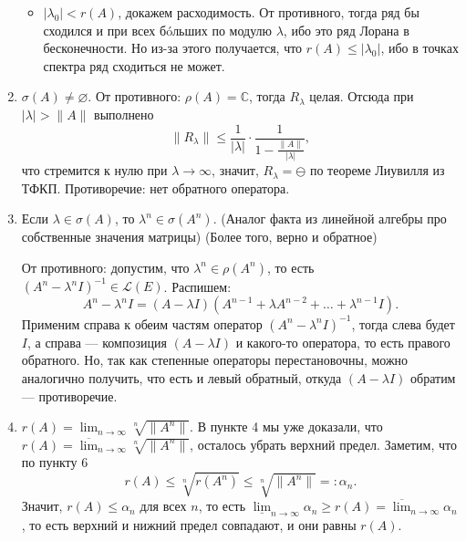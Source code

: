 \begin{enumerate}
\begin{itemize}
            \item $|\lambda_0| < r(A)$, докажем расходимость.
                От противного, тогда ряд бы сходился и при всех бóльших по модулю $\lambda$, ибо это ряд Лорана в бесконечности.
                Но из-за этого получается, что $r(A) \le |\lambda_0|$, ибо в точках спектра ряд сходиться не может.
        \end{itemize}

    \item $\sigma(A) \ne \varnothing$.
        От противного: $\rho(A) = \mathbb C$, тогда $R_\lambda$ целая.
        Отсюда при $|\lambda| > \|A\|$ выполнено
        \[
            \|R_\lambda\| \le \frac{1}{|\lambda|} \cdot \frac{1}{1 - \frac{\|A\|}{|\lambda|}},
        \]
        что стремится к нулю при $\lambda \to \infty$, значит, $R_\lambda = \ominus$ по теореме Лиувилля из ТФКП.
        Противоречие: нет обратного оператора.

    \item Если $\lambda \in \sigma(A)$, то $\lambda^n \in \sigma(A^n)$.
        (Аналог факта из линейной алгебры про собственные значения матрицы)
        (Более того, верно и обратное)

        От противного: допустим, что $\lambda^n \in \rho(A^n)$, то есть $(A^n - \lambda^n I)^{-1} \in \mathcal L(E)$.
        Распишем:
        \[
            A^n - \lambda^n I = (A - \lambda I)(A^{n-1} + \lambda A^{n-2} + \dots + \lambda^{n-1} I).
        \]
        Применим справа к обеим частям оператор $(A^n - \lambda^n I)^{-1}$, тогда слева будет $I$, а справа --- композиция $(A - \lambda I)$ и какого-то оператора, то есть правого обратного.
        Но, так как степенные операторы перестановочны, можно аналогично получить, что есть и левый обратный, откуда $(A - \lambda I)$ обратим --- противоречие.

    \item $r(A) = \lim_{n \to \infty} \sqrt[n]{\|A^n\|}$.
        В пункте 4 мы уже доказали, что $r(A) = \overline{\lim}_{n \to \infty} \sqrt[n]{\|A^n\|}$, осталось убрать верхний предел.
        Заметим, что по пункту 6
        \[
            r(A) \le \sqrt[n]{r(A^n)} \le \sqrt[n]{\|A^n\|} =: \alpha_n.
        \]
        Значит, $r(A) \le \alpha_n$ для всех $n$, то есть $\underline{\lim}_{n \to \infty} \alpha_n \ge r(A) = \overline{\lim}_{n \to \infty} \alpha_n$, то есть верхний и нижний предел совпадают, и они равны $r(A)$.
\end{enumerate}

\QED

